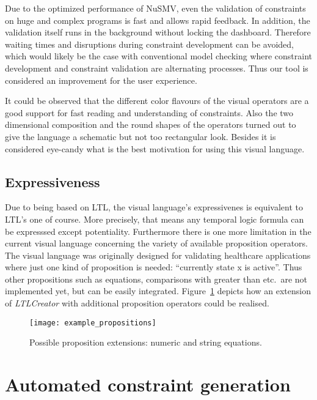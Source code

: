Due to the optimized performance of NuSMV, even the validation of constraints on huge and complex programs is fast and allows rapid feedback. In addition, the validation itself runs in the background without locking the dashboard. Therefore waiting times and disruptions during constraint development can be avoided, which would likely be the case with conventional model checking where constraint development and constraint validation are alternating processes. Thus our tool is considered an improvement for the user experience.

It could be observed that the different color flavours of the visual operators are a good support for fast reading and understanding of constraints. Also the two dimensional composition and the round shapes of the operators turned out to give the language a schematic but not too rectangular look. Besides it is considered eye-candy what is the best motivation for using this visual language.





\subsection{Expressiveness}

Due to being based on LTL, the visual language's expressivenes is equivalent to LTL's one of course. More precisely, that means any temporal logic formula can be expresssed except potentiality.
Furthermore there is one more limitation in the current visual language concerning the variety of available proposition operators. The visual language was originally designed for validating healthcare applications where just one kind of proposition is needed: ``currently state x is active''. Thus other propositions such as equations, comparisons with greater than etc.\ are not implemented yet, but can be easily integrated.
Figure~\ref{fig:example_propositions} depicts how an extension of \emph{LTLCreator} with additional proposition operators could be realised.

\begin{figure}[htbp]
  \centering
  \texttt{[image: example\_propositions]}
  \caption{Possible proposition extensions: numeric and string equations.}
  \label{fig:example_propositions}
\end{figure}



\section{Automated constraint generation}
\label{sec:testscenarioandevaluation_automatedconstraintgeneration}

